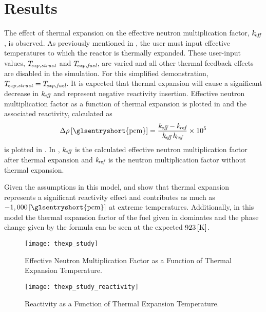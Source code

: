 \section{Results}
  The effect of thermal expansion on the effective neutron multiplication
  factor, $k_{\!\mbox{\scriptsize \em eff}}$, is observed. As previously mentioned in
  , the user must input
  effective temperatures to which the reactor is thermally expanded. These
  user-input values, $T_{\!\mbox{\scriptsize \em exp,struct}}$ and ${T_{\!\mbox{\scriptsize \em exp,fuel}}}$, are varied and all other
  thermal feedback effects are disabled in the simulation. For this simplified
  demonstration, $T_{\!\mbox{\scriptsize \em exp,struct}}={T_{\!\mbox{\scriptsize \em exp,fuel}}}$. It is expected that thermal expansion
  will cause a significant decrease in $k_{\!\mbox{\scriptsize \em eff}}$ and represent negative reactivity
  insertion. Effective neutron multiplication factor as a function of thermal
  expansion is plotted in  and the associated reactivity,
  calculated as
  \begin{equation}
    \label{eq:reactivity_formula}
    \Delta \rho \units{\glsentryshort{pcm}} = \frac{\keff - \kref}{\keff \, \kref} \times 10^5
  \end{equation}
  is plotted in . In
  , $k_{\!\mbox{\scriptsize \em eff}}$ is the calculated effective neutron
  multiplication factor after thermal expansion and $k_{\!\mbox{\scriptsize \em ref}}$ is the neutron
  multiplication factor without thermal expansion. 

  Given the assumptions in this model,  and
   show that thermal expansion represents a
  significant reactivity effect and contributes as much as $-1,000
  \units{\glsentryshort{pcm}}$ at extreme temperatures. Additionally, in this
  model the thermal expansion factor of the fuel given in 
  dominates and the phase change given by the formula can be seen at the
  expected $923 \left[\text{{K}}\right]$.

  \begin{figure}
    \centering
    \texttt{[image: thexp\_study]}
    \caption{Effective Neutron Multiplication Factor as a Function of 
      Thermal Expansion Temperature.}
    \label{fig:thexp_study}
  \end{figure}

  \begin{figure}
    \centering
    \texttt{[image: thexp\_study\_reactivity]}
    \caption{Reactivity as a Function of Thermal Expansion Temperature.}
    \label{fig:thexp_study_reactivity}
  \end{figure}
